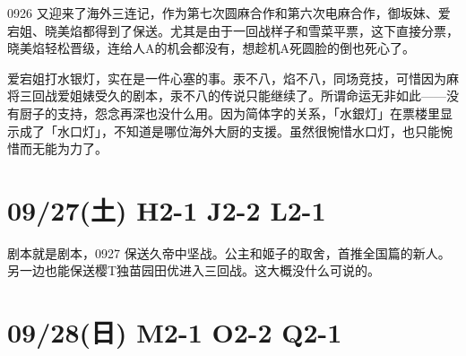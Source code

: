 0926 又迎来了海外三连记，作为第七次圆麻合作和第六次电麻合作，御坂妹、爱宕姐、晓美焰都得到了保送。尤其是由于一回战样子和雪菜平票，这下直接分票，晓美焰轻松晋级，连给人A的机会都没有，想趁机A死圆脸的倒也死心了。

爱宕姐打水银灯，实在是一件心塞的事。汞不八，焰不八，同场竞技，可惜因为麻将三回战爱姐婊受久的剧本，汞不八的传说只能继续了。所谓命运无非如此——没有厨子的支持，怨念再深也没什么用。因为简体字的关系，「水銀灯」在票楼里显示成了「水口灯」，不知道是哪位海外大厨的支援。虽然很惋惜水口灯，也只能惋惜而无能为力了。

\section{09/27(土) H2-1 J2-2 L2-1}


剧本就是剧本，0927 保送久帝中坚战。公主和姬子的取舍，首推全国篇的新人。另一边也能保送樱T独苗园田优进入三回战。这大概没什么可说的。

\section{09/28(日) M2-1 O2-2 Q2-1}


